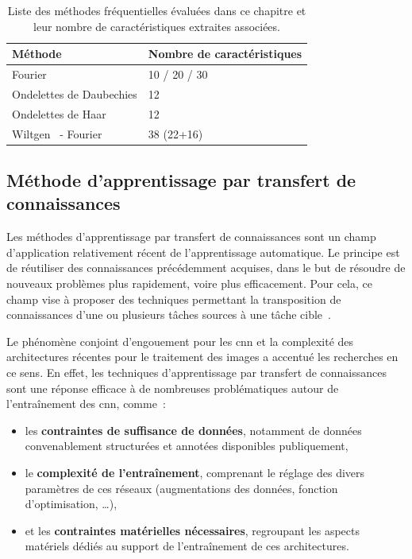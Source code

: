 \begin{table}[H]
    \centering
    \begin{tabular}{ll}
        \toprule
        \textbf{Méthode}                        & \textbf{Nombre de caractéristiques}   \\ \hline
        Fourier                                 & 10 / 20 / 30                          \\ \hline
        Ondelettes de Daubechies                & 12                                    \\ \hline
        Ondelettes de Haar                      & 12                                    \\ \hline
        Wiltgen~\cite{Wiltgen2008} - Fourier    & 38 (22+16)                             \\
        \bottomrule
    \end{tabular}
    \caption{Liste des méthodes fréquentielles évaluées dans ce chapitre et leur nombre de caractéristiques extraites associées.}
    \label{tab:number_features_frequency}
\end{table}\par
\clearpage

\subsection{Méthode d'apprentissage par transfert de connaissances}
Les méthodes d'apprentissage par transfert de connaissances sont un champ d'application relativement récent de l'apprentissage automatique. Le principe est de réutiliser des connaissances précédemment acquises, dans le but de résoudre de nouveaux problèmes plus rapidement, voire plus efficacement. Pour cela, ce champ vise à proposer des techniques permettant la transposition de connaissances d'une ou plusieurs tâches sources à une tâche cible~\cite{Pan2010}.\par

Le phénomène conjoint d'engouement pour les \gls{cnn} et la complexité des architectures récentes pour le traitement des images a accentué les recherches en ce sens. En effet, les techniques d'apprentissage par transfert de connaissances sont une réponse efficace à de nombreuses problématiques autour de l'entraînement des \gls{cnn}, comme~:~
\begin{itemize}
    \item les \textbf{contraintes de suffisance de données}, notamment de données convenablement structurées et annotées disponibles publiquement,
    \item le \textbf{complexité de l'entraînement}, comprenant le réglage des divers paramètres de ces réseaux (augmentations des données, fonction d'optimisation, \ldots),
    \item et les \textbf{contraintes matérielles nécessaires}, regroupant les aspects matériels dédiés au support de l'entraînement de ces architectures.
\end{itemize}\par

